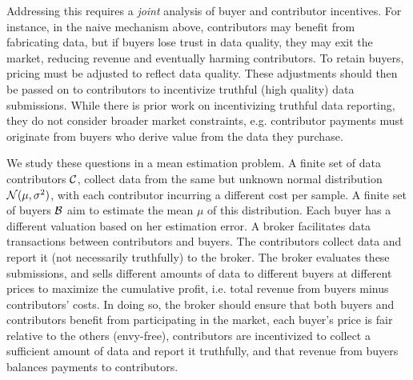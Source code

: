 Addressing this requires a \emph{joint} analysis of buyer and contributor incentives.
For instance, in the naive mechanism above, contributors may benefit from fabricating data, but if buyers lose trust in data quality, they may exit the market, reducing revenue and  eventually harming contributors.
To retain buyers, pricing must be adjusted to reflect data quality.
These adjustments should then be passed on to contributors to incentivize truthful (high quality) data submissions.
While there is prior work on incentivizing truthful data reporting, they do not consider broader market constraints, e.g. contributor payments must originate from buyers who derive value from the data they purchase.

We study these questions in a mean estimation problem. A finite set of data contributors $\mathcal{C}$, collect data from the same but unknown normal distribution $\mathcal{N}(\mu,\sigma^2)$, with each contributor  incurring a different cost  per sample.
A finite set of buyers $\mathcal{B}$ aim to estimate the mean $\mu$ of this distribution.
Each buyer has a different valuation  based on her estimation error. A broker facilitates data transactions between contributors and buyers.
The contributors collect data and report it (not necessarily truthfully) to the broker.
The broker evaluates these submissions,  and sells different amounts of data to different buyers at different prices to maximize the cumulative profit, i.e. total revenue from buyers minus contributors' costs. 
In doing so, the broker should ensure that both buyers and contributors benefit from participating in the market, each buyer's price is fair relative to the others (envy-free), contributors are incentivized to collect a sufficient amount of data and report it truthfully, and that revenue from buyers balances payments to contributors.




